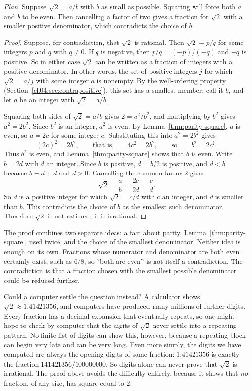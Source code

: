 \noindent\textit{Plan.} Suppose $\sqrt2=a/b$ with $b$ as small as possible. Squaring will force both $a$ and $b$ to be even. Then cancelling a factor of two gives a fraction for $\sqrt2$ with a smaller positive denominator, which contradicts the choice of $b$.
\begin{proof}
Suppose, for contradiction, that $\sqrt2$ is rational. Then $\sqrt2=p/q$ for some integers $p$ and $q$ with $q\ne0$. If $q$ is negative, then $p/q=(-p)/(-q)$ and $-q$ is positive. So in either case $\sqrt2$ can be written as a fraction of integers with a positive denominator. In other words, the set of positive integers $j$ for which $\sqrt2=a/j$ with some integer $a$ is nonempty. By the well-ordering property (Section~\ref{ch04:sec:contrapositive}), this set has a smallest member; call it $b$, and let $a$ be an integer with $\sqrt2=a/b$.

Squaring both sides of $\sqrt2=a/b$ gives $2=a^2/b^2$, and multiplying by $b^2$ gives $a^2=2b^2$. Since $b^2$ is an integer, $a^2$ is even. By Lemma~\ref{thm:parity-square}, $a$ is even, so $a=2c$ for some integer $c$. Substituting this into $a^2=2b^2$ gives
\[
(2c)^2=2b^2,\qquad\text{that is,}\qquad 4c^2=2b^2,\qquad\text{so}\qquad b^2=2c^2.
\]
Thus $b^2$ is even, and Lemma~\ref{thm:parity-square} shows that $b$ is even. Write $b=2d$ with $d$ an integer. Since $b$ is positive, $d=b/2$ is positive, and $d<b$ because $b=d+d$ and $d>0$. Cancelling the common factor $2$ gives
\[
\sqrt2=\frac{a}{b}=\frac{2c}{2d}=\frac{c}{d}.
\]
So $d$ is a positive integer for which $\sqrt2=c/d$ with $c$ an integer, and $d$ is smaller than $b$. This contradicts the choice of $b$ as the smallest such denominator. Therefore $\sqrt2$ is not rational; it is irrational.
\end{proof}

The proof combines two separate ideas: a fact about parity, Lemma~\ref{thm:parity-square}, used twice, and the choice of the smallest denominator. Neither idea is enough on its own. Fractions whose numerator and denominator are both even certainly exist, such as $6/8$, so ``both are even'' is not itself a contradiction. The contradiction is that a fraction chosen with the smallest possible denominator could be reduced further.

Could a computer settle the question instead? A calculator shows $\sqrt2\approx1.41421356$, and computers have produced many millions of further digits. Every fraction has a decimal expansion that eventually repeats, so one might hope to check by computer that the digits of $\sqrt2$ never settle into a repeating pattern. No finite list of digits can show this, however, because a repeating block can begin very late and can be very long. Even more simply, the digits we have computed are always the opening digits of some fraction: $1.41421356$ is exactly the fraction $141421356/100000000$. So digits alone can never prove that $\sqrt2$ is irrational. The proof above avoids the difficulty entirely, because it shows that \emph{no} fraction, of any size, has square equal to $2$.

